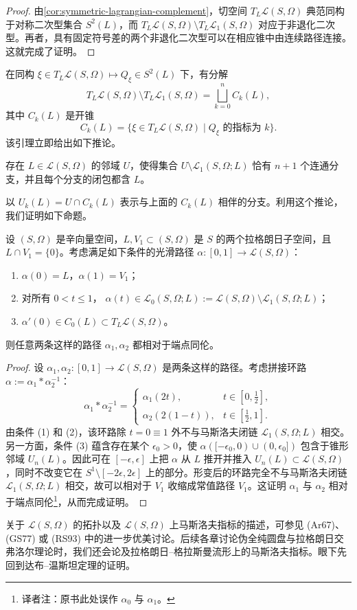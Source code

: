\begin{proof}
由\cref{cor:symmetric-lagrangian-complement}，切空间
$T_L\mathcal L(S,\Omega)$ 典范同构于对称二次型集合 $S^2(L)$，而
$T_L\mathcal L(S,\Omega)\setminus T_L\mathcal L_1(S,\Omega)$ 对应于非退化二次型。再者，具有固定符号差的两个非退化二次型可以在相应锥中由连续路径连接。这就完成了证明。
\end{proof}

在同构
$\xi\in T_L\mathcal L(S,\Omega)\longmapsto Q_\xi\in S^2(L)$ 下，有分解
\[
 T_L\mathcal L(S,\Omega)\setminus T_L\mathcal L_1(S,\Omega)
 =\bigsqcup_{k=0}^n C_k(L),
\]
其中 $C_k(L)$ 是开锥
\[
 C_k(L)=\{\xi\in T_L\mathcal L(S,\Omega)\mid Q_\xi\text{ 的指标为 }k\}.
\]
该引理立即给出如下推论。

\begin{corollary}\label{cor:maslov-complement-components}
存在 $L\in\mathcal L(S,\Omega)$ 的邻域 $U$，使得集合
$U\setminus\mathcal L_1(S,\Omega;L)$ 恰有 $n+1$ 个连通分支，并且每个分支的闭包都含 $L$。
\end{corollary}

以 $U_k(L)=U\cap C_k(L)$ 表示与上面的 $C_k(L)$ 相伴的分支。利用这个推论，我们证明如下命题。

\begin{proposition}\label{prop:positive-lagrangian-path-homotopy}
设 $(S,\Omega)$ 是辛向量空间，$L,V_1\subset(S,\Omega)$ 是 $S$ 的两个拉格朗日子空间，且
$L\cap V_1=\{0\}$。考虑满足如下条件的光滑路径
$\alpha:[0,1]\to\mathcal L(S,\Omega)$：
\begin{enumerate}[label=(\arabic*)]
\item $\alpha(0)=L$，$\alpha(1)=V_1$；
\item 对所有 $0<t\le1$，
$\alpha(t)\in\mathcal L_0(S,\Omega;L):=\mathcal L(S,\Omega)\setminus\mathcal L_1(S,\Omega;L)$；
\item $\alpha'(0)\in C_0(L)\subset T_L\mathcal L(S,\Omega)$。
\end{enumerate}
则任意两条这样的路径 $\alpha_1,\alpha_2$ 都相对于端点同伦。
\end{proposition}

\begin{proof}
设 $\alpha_1,\alpha_2:[0,1]\to\mathcal L(S,\Omega)$ 是两条这样的路径。考虑拼接环路
$\alpha:=\alpha_1*\alpha_2^{-1}$：
\[
 \alpha_1*\alpha_2^{-1}=
 \begin{cases}
  \alpha_1(2t),&t\in[0,\tfrac12],\\
  \alpha_2(2(1-t)),&t\in[\tfrac12,1].
 \end{cases}
\]
由条件 (1) 和 (2)，该环路除 $t=0\equiv1$ 外不与马斯洛夫闭链
$\mathcal L_1(S,\Omega;L)$ 相交。另一方面，条件 (3) 蕴含存在某个
$\epsilon_0>0$，使
$\alpha([ -\epsilon_0,0)\cup(0,\epsilon_0])$ 包含于锥形邻域 $U_n(L)$。因此可在
$[-\epsilon,\epsilon]$ 上把 $\alpha$ 从 $L$ 推开并推入
$U_n(L)\subset\mathcal L(S,\Omega)$，同时不改变它在
$S^1\setminus[-2\epsilon,2\epsilon]$ 上的部分。形变后的环路完全不与马斯洛夫闭链
$\mathcal L_1(S,\Omega;L)$ 相交，故可以相对于 $V_1$ 收缩成常值路径 $V_1$。这证明
$\alpha_1$ 与 $\alpha_2$ 相对于端点同伦\footnote{译者注：原书此处误作 $\alpha_0$ 与 $\alpha_1$。}，从而完成证明。
\end{proof}

关于 $\mathcal L(S,\Omega)$ 的拓扑以及 $\mathcal L(S,\Omega)$ 上马斯洛夫指标的描述，可参见 (Ar67)、(GS77) 或 (RS93) 中的进一步优美讨论。后续各章讨论伪全纯圆盘与拉格朗日交弗洛尔理论时，我们还会论及拉格朗日--格拉斯曼流形上的马斯洛夫指标。眼下先回到达布--温斯坦定理的证明。
